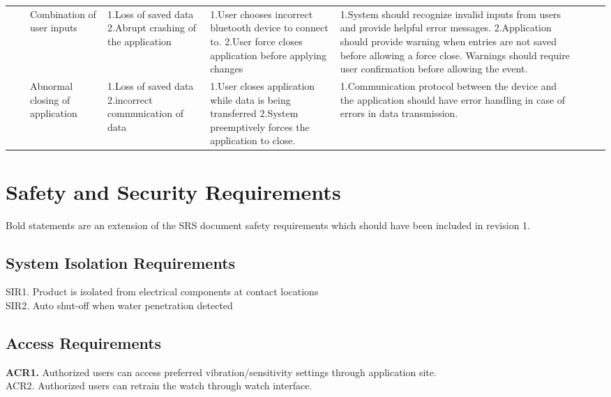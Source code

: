 \documentclass{article}
\begin{document}
\begin{table}[H]
\begin{tabular}{| p{} | p{}  | p{} | p{} | p{} | p{} | p{} | p{} | p{} |}
     & & Combination of user inputs & 1.Loss of saved data \newline 2.Abrupt crashing of the application  &  1.User chooses incorrect bluetooth device to connect to. \newline 2.User force closes application before applying changes  &  1.System should recognize invalid inputs from users and provide helpful error messages. \newline 2.Application should provide warning when entries are not saved before allowing a force close. Warnings should require user confirmation before allowing the event.  &  &  &  \\ \cline{3-9}

     & & Abnormal closing of application & 1.Loss of saved data \newline 2.incorrect communication of data  & 1.User closes application while data is being transferred \newline 2.System preemptively forces the application to close. & 1.Communication protocol between the device and the application should have error handling in case of errors in data transmission.  & & &  \\ \hline
    
    \end{tabular}
    \end{table}

\newpage 
\section{Safety and Security Requirements}

Bold statements are an extension of the SRS document safety requirements which should have been included in revision 1.

\subsection{System Isolation Requirements}

SIR1. Product is isolated from electrical components at contact locations
\\SIR2. Auto shut-off when water penetration detected

\subsection{Access Requirements}

\textbf{ACR1.} Authorized users can access preferred vibration/sensitivity settings through application site.
\\ACR2. Authorized users can retrain the watch through watch interface. 
\end{document}
